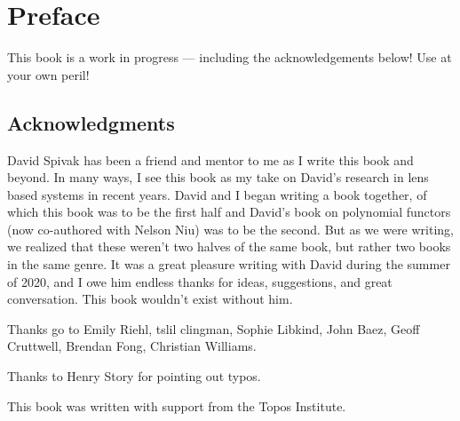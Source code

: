 \documentclass[DynamicalBook]{subfiles}
\begin{document}
%


\setcounter{chapter}{0}%


\chapter{Preface}\label{chapter.0}

This book is a work in progress --- including the acknowledgements below! Use at your own peril!

\section*{Acknowledgments}

David Spivak has been a friend and mentor to me as I write this book and beyond.
In many ways, I see this book as my take on David's research in lens based
systems in recent years. David and I began writing a book together, of which
this book was to be the first half and David's book on polynomial functors (now
co-authored with Nelson Niu) was to be the second. But as we were writing, we
realized that these weren't two halves of the same book, but rather two books
in the same genre. It was a great pleasure writing with David during the summer
of 2020, and I owe him endless thanks for ideas, suggestions, and great
conversation. This book wouldn't exist without him.



Thanks go to Emily Riehl, tslil clingman, Sophie Libkind, John Baez, Geoff Cruttwell, Brendan
Fong, Christian Williams.

Thanks to Henry Story for pointing out typos.

This book was written with support from the Topos Institute.
\end{document}
